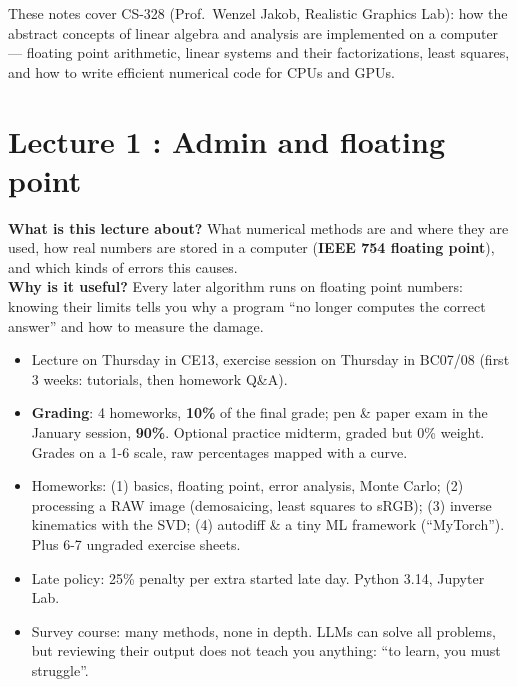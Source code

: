 \documentclass[11pt,a4paper,openany]{book}
\begin{document}
\raggedbottom


\tableofcontents
\clearpage

These notes cover CS-328 (Prof.\ Wenzel Jakob, Realistic Graphics Lab): how the abstract
concepts of linear algebra and analysis are implemented on a computer --- floating point
arithmetic, linear systems and their factorizations, least squares, and how to write efficient
numerical code for CPUs and GPUs.


\chapter{Lecture 1 : Admin and floating point}

\begin{rembox}[title=In a nutshell]
\textbf{What is this lecture about?} What numerical methods are and where they are used, how
real numbers are stored in a computer (\textbf{IEEE 754 floating point}), and which kinds of
errors this causes. \\
\textbf{Why is it useful?} Every later algorithm runs on floating point numbers: knowing their
limits tells you why a program ``no longer computes the correct answer'' and how to measure the
damage.
\end{rembox}

\begin{rembox}[title=Course organisation]
\begin{itemize}
  \item Lecture on Thursday in CE13, exercise session on Thursday in BC07/08 (first 3 weeks:
        tutorials, then homework Q\&A).
  \item \textbf{Grading}: 4 homeworks, \textbf{10\%} of the final grade; pen \& paper exam in
        the January session, \textbf{90\%}. Optional practice midterm, graded but 0\% weight.
        Grades on a 1-6 scale, raw percentages mapped with a curve.
  \item Homeworks: (1) basics, floating point, error analysis, Monte Carlo; (2) processing a
        RAW image (demosaicing, least squares to sRGB); (3) inverse kinematics with the SVD;
        (4) autodiff \& a tiny ML framework (``MyTorch''). Plus 6-7 ungraded exercise sheets.
  \item Late policy: 25\% penalty per extra started late day. Python 3.14, Jupyter Lab.
  \item Survey course: many methods, none in depth. LLMs can solve all problems, but reviewing
        their output does not teach you anything: ``to learn, you must struggle''.
\end{itemize}
\end{rembox}
\end{document}
